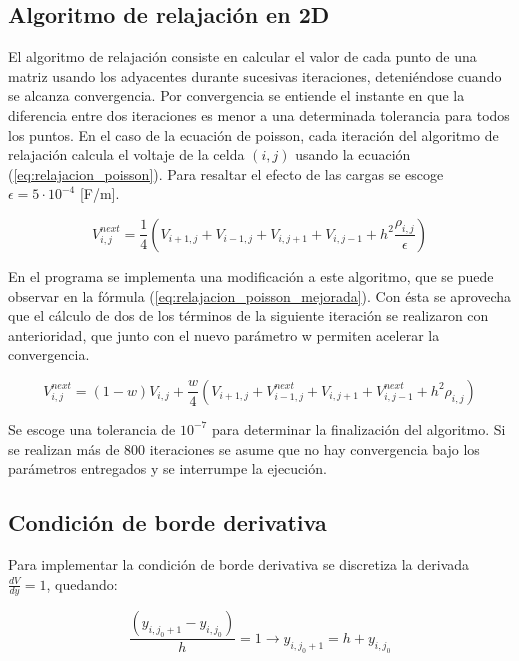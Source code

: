 \documentclass{article}
\begin{document}
\subsection{Algoritmo de relajación en 2D}
\label{sec:algoritmo}

El algoritmo de relajación consiste en calcular el valor de cada punto de una matriz usando los adyacentes durante sucesivas iteraciones, deteniéndose cuando se alcanza convergencia. Por convergencia se entiende el instante en que la diferencia entre dos iteraciones es menor a una determinada tolerancia para todos los puntos. En el caso de la ecuación de poisson, cada iteración del algoritmo de relajación calcula el voltaje de la celda $(i, j)$ usando la ecuación (\ref{eq:relajacion_poisson}). Para resaltar el efecto de las cargas se escoge $\epsilon = 5\cdot10^{-4}$ [F/m].

\begin{equation}
  V_{i,j}^{next} = \frac{1}{4} (V_{i+1,j} + V_{i-1,j} + V_{i,j+1} + V_{i,j-1} + h^2 \frac{\rho_{i,j}}{\epsilon}) 
  \label{eq:relajacion_poisson}
\end{equation}

En el programa se implementa una modificación a este algoritmo, que se puede observar en la fórmula (\ref{eq:relajacion_poisson_mejorada}). Con ésta se aprovecha que el cálculo de dos de los términos de la siguiente iteración se realizaron con anterioridad, que junto con el nuevo parámetro w permiten acelerar la convergencia.

\begin{equation}
  V_{i,j}^{next} = (1 - w)V_{i,j} + \frac{w}{4}(V_{i+1,j} + V_{i-1,j}^{next} + V_{i,j+1} + V_{i,j-1}^{next} + h^2 \rho_{i,j})
  \label{eq:relajacion_poisson_mejorada}
\end{equation}

Se escoge una tolerancia de $10^{-7}$ para determinar la finalización del algoritmo. Si se realizan más de 800 iteraciones se asume que no hay convergencia bajo los parámetros entregados y se interrumpe la ejecución.

\subsection{Condición de borde derivativa}

Para implementar la condición de borde derivativa se discretiza la derivada $\frac{dV}{dy} = 1$, quedando:

\begin{equation}
  \dfrac{(y_{i,j_0 + 1} - y_{i,j_0})}{h} = 1 \rightarrow y_{i,j_0 + 1} = h + y_{i,j_0}
\end{equation}
\end{document}
